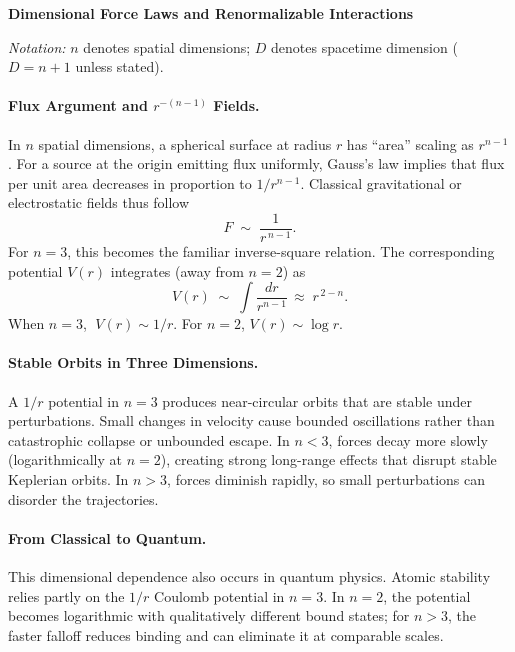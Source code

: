 \begin{technical}
    {\Large \textbf{Dimensional Force Laws and Renormalizable Interactions}}
    
    \noindent\emph{Notation:} $n$ denotes spatial dimensions; $D$ denotes spacetime dimension ($D=n+1$ unless stated).
    
    \paragraph{Flux Argument and $r^{-(n-1)}$ Fields.}
    In $n$ spatial dimensions, a spherical surface at radius $r$ has ``area'' scaling as $r^{n-1}$. For a source at the origin emitting flux uniformly, Gauss's law implies that flux per unit area decreases in proportion to $1/r^{n-1}$. Classical gravitational or electrostatic fields thus follow 
    $$
    F \;\sim\; \frac{1}{r^{\,n-1}}.
    $$
    For $n=3$, this becomes the familiar inverse-square relation. The corresponding potential $V(r)$ integrates (away from $n=2$) as
    $$
    V(r) \;\sim\; \int \frac{dr}{r^{n-1}} \,\approx\; r^{\,2-n}.
    $$
    When $n=3$, $\;V(r)\sim 1/r$. For $n=2$, $V(r)\sim \log r$.
    
    \paragraph{Stable Orbits in Three Dimensions.}
    A $1/r$ potential in $n=3$ produces near-circular orbits that are stable under perturbations. Small changes in velocity cause bounded oscillations rather than catastrophic collapse or unbounded escape. In $n<3$, forces decay more slowly (logarithmically at $n=2$), creating strong long-range effects that disrupt stable Keplerian orbits. In $n>3$, forces diminish rapidly, so small perturbations can disorder the trajectories.
    
    \paragraph{From Classical to Quantum.}
    This dimensional dependence also occurs in quantum physics. Atomic stability relies partly on the $1/r$ Coulomb potential in $n=3$. In $n=2$, the potential becomes logarithmic with qualitatively different bound states; for $n>3$, the faster falloff reduces binding and can eliminate it at comparable scales.
    

\end{technical}
